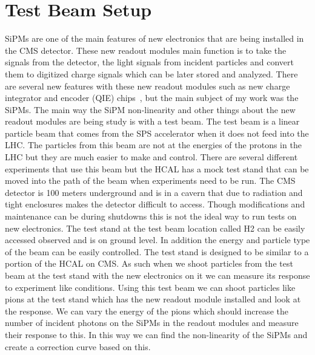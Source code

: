 \section{Test Beam Setup}

SiPMs are one of the main features of new electronics that are being installed in the CMS detector. These new readout modules main function is to take the signals from the detector, the light signals from incident particles and convert them to digitized charge signals which can be later stored and analyzed. There are several new features with these new readout modules such as new charge integrator and encoder (QIE) chips~\cite{QIE,QIE2}, but the main subject of my work was the SiPMs. The main way the SiPM non-linearity and other things about the new readout modules are being study is with a test beam. The test beam is a linear particle beam that comes from the SPS accelerator when it does not feed into the LHC. The particles from this beam are not at the energies of the protons in the LHC but they are much easier to make and control. There are several different experiments that use this beam but the HCAL has a mock test stand that can be moved into the path of the beam when experiments need to be run. The CMS detector is 100 meters underground and is in a cavern that due to radiation and tight enclosures makes the detector difficult to access. Though modifications and maintenance can be during shutdowns this is not the ideal way to run tests on new electronics. The test stand at the test beam location called H2 can be easily accessed observed and is on ground level. In addition the energy and particle type of the beam can be easily controlled. The test stand is designed to be similar to a portion of the HCAL on CMS. As such when we shoot particles from the test beam at the test stand with the new electronics on it we can measure its response to experiment like conditions. Using this test beam we can shoot particles like pions at the test stand which has the new readout module installed and look at the response. We can vary the energy of the pions which should increase the number of incident photons on the SiPMs in the readout modules and measure their response to this. In this way we can find the non-linearity of the SiPMs and create a correction curve based on this.

